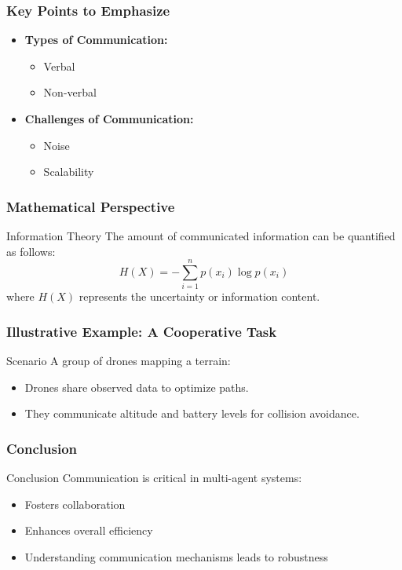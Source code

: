\documentclass[aspectratio=169]{beamer}
\begin{document}
\begin{frame}[fragile]
    \frametitle{Key Points to Emphasize}
    \begin{itemize}
        \item \textbf{Types of Communication:}
        \begin{itemize}
            \item Verbal
            \item Non-verbal
        \end{itemize}
        
        \item \textbf{Challenges of Communication:}
        \begin{itemize}
            \item Noise
            \item Scalability
        \end{itemize}
    \end{itemize}
\end{frame}

\begin{frame}[fragile]
    \frametitle{Mathematical Perspective}
    \begin{block}{Information Theory}
        The amount of communicated information can be quantified as follows:
        \begin{equation}
        H(X) = -\sum_{i=1}^{n} p(x_i) \log p(x_i)
        \end{equation}
        where \(H(X)\) represents the uncertainty or information content.
    \end{block}
\end{frame}

\begin{frame}[fragile]
    \frametitle{Illustrative Example: A Cooperative Task}
    \begin{block}{Scenario}
        A group of drones mapping a terrain:
        \begin{itemize}
            \item Drones share observed data to optimize paths.
            \item They communicate altitude and battery levels for collision avoidance.
        \end{itemize}
    \end{block}
\end{frame}

\begin{frame}[fragile]
    \frametitle{Conclusion}
    \begin{block}{Conclusion}
        Communication is critical in multi-agent systems:
        \begin{itemize}
            \item Fosters collaboration
            \item Enhances overall efficiency
            \item Understanding communication mechanisms leads to robustness
        \end{itemize}
    \end{block}
\end{frame}
\end{document}
